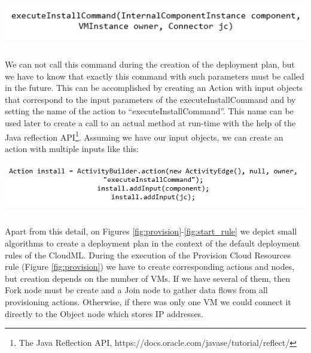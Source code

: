 \begin{center}
	\includegraphics[width=38em]{./Figures/Install}
	\begin{lstlisting}[mathescape,caption={Install command declaration},label={lst:13}]
	\end{lstlisting}
\end{center}

\noindent We can not call this command during the creation of the deployment plan, but we have to know that exactly this command with such parameters must be called in the future. This can be accomplished by creating an Action with input objects that correspond to the input parameters of the executeInstallCommand and by setting the name of the action to ``executeInstallCommand''. This name can be used later to create a call to an actual method at run-time with the help of the Java reflection API\footnote{ The Java Reflection API, $  $https://docs.oracle.com/javase/tutorial/reflect/}. Assuming we have our input objects, we can create an action with multiple inputs like this:

\begin{center}
	\includegraphics[width=38em]{./Figures/Inputs}
	\begin{lstlisting}[mathescape,caption={Passing data to actions},label={lst:14}]
	\end{lstlisting}
\end{center}

\noindent Apart from this detail, on Figures \ref{fig:provision}-\ref{fig:start_rule} we depict small algorithms to create a deployment plan in the context of the default deployment rules of the CloudML. During the execution of the Provision Cloud Resources rule (Figure \ref{fig:provision}) we have to create corresponding actions and nodes, but creation depends on the number of VMs. If we have several of them, then Fork node must be create and a Join node to gather data flows from all provisioning actions. Otherwise, if there was only one VM we could connect it directly to the Object node which stores IP addresses.

\noindent 

